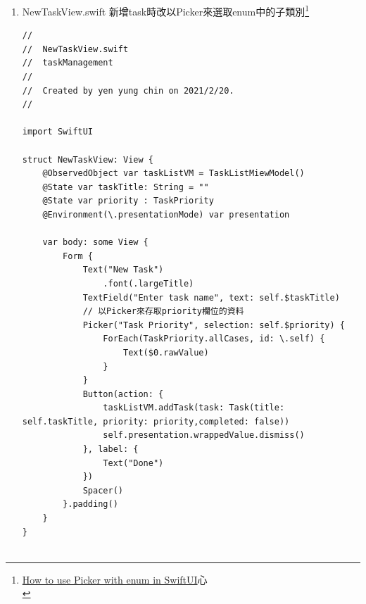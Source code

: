 \documentclass[a4paper,12pt]{article}
\begin{document}
\begin{enumerate}
\begin{enumerate}
\begin{lstlisting}
                    }
                    .onDelete(perform: { indexSet in
                        taskListVM.deleteTask(indexSet: indexSet)
                    })
                }

                .navigationBarTitle("Tasks", displayMode: .inline)

                .navigationBarItems(trailing: NavigationLink(
                                        destination: NewTaskView(taskListVM: taskListVM, taskTitle: "", priority: TaskPriority.low),
                                        label: {
                                            Text("New Task")
                                        }))

            })
        }
    }
}

struct ContentView_Previews: PreviewProvider {
    static var previews: some View {
        TaskListView()
    }
}

struct TaskCell: View {
    @ObservedObject var taskCellVM: TaskCellViewModel

    var body: some View {
        HStack {
            Image(systemName: taskCellVM.completionStateIconName)
            Image(systemName: taskCellVM.priorityStateIconName)
                .foregroundColor(Color.blue)
            Text(taskCellVM.task.title)
        }
    }
}
\end{lstlisting}
\item NewTaskView.swift
\label{sec:org09feea3}
新增task時改以Picker來選取enum中的子類別\footnote{\href{https://github.com/onmyway133/blog/issues/611}{ How to use Picker with enum in SwiftUI}心\\\label{org4d52cf2}}\\
\lstset{breaklines=true,language=swift,label= ,caption= ,captionpos=b,firstnumber=1,numbers=left}
\begin{lstlisting}
//
//  NewTaskView.swift
//  taskManagement
//
//  Created by yen yung chin on 2021/2/20.
//

import SwiftUI

struct NewTaskView: View {
    @ObservedObject var taskListVM = TaskListMiewModel()
    @State var taskTitle: String = ""
    @State var priority : TaskPriority
    @Environment(\.presentationMode) var presentation

    var body: some View {
        Form {
            Text("New Task")
                .font(.largeTitle)
            TextField("Enter task name", text: self.$taskTitle)
            // 以Picker來存取priority欄位的資料
            Picker("Task Priority", selection: self.$priority) {
                ForEach(TaskPriority.allCases, id: \.self) {
                    Text($0.rawValue)
                }
            }
            Button(action: {
                taskListVM.addTask(task: Task(title: self.taskTitle, priority: priority,completed: false))
                self.presentation.wrappedValue.dismiss()
            }, label: {
                Text("Done")
            })
            Spacer()
        }.padding()
    }
}


\end{lstlisting}
\end{enumerate}
\end{enumerate}
\end{document}
